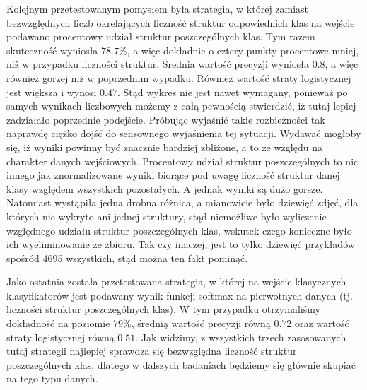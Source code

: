 Kolejnym przetestowanym pomysłem była strategia, w której zamiast bezwzględnych liczb okrelających liczność struktur odpowiednich klas na wejście podawano procentowy udział struktur poszczególnych klas. Tym razem skuteczność wyniosła $78.7\%$, a więc dokładnie o cztery punkty procentowe mniej, niż w przypadku liczności struktur. Średnia wartość precyzji wyniosła $0.8$, a więc również gorzej niż w poprzednim wypadku. Również wartość straty logistycznej jest większa i wynosi $0.47$. Stąd wykres nie jest nawet wymagany, ponieważ po samych wynikach liczbowych możemy z całą pewnością stwierdzić, iż tutaj lepiej zadziałało poprzednie podejście. Próbując wyjaśnić takie rozbieżności tak naprawdę ciężko dojść do sensownego wyjaśnienia tej sytuacji. Wydawać mogłoby się, iż wyniki powinny być znacznie bardziej zbliżone, a to ze względu na charakter danych wejściowych. Procentowy udział struktur poszczególnych to nic innego jak znormalizowane wyniki biorące pod uwagę liczność struktur danej klasy względem wszystkich pozostałych. A jednak wyniki są dużo gorsze. Natomiast wystąpiła jedna drobna różnica, a mianowicie było dziewięć zdjęć, dla których nie wykryto ani jednej struktury, stąd niemożliwe było wyliczenie względnego udziału struktur poszczególnych klas, wskutek czego konieczne było ich wyeliminowanie ze zbioru. Tak czy inaczej, jest to tylko dziewięć przykładów spośród 4695 wszystkich, stąd można ten fakt pominąć. 

Jako ostatnia została przetestowana strategia, w której na wejście klasycznych klasyfikatorów jest podawany wynik funkcji softmax na pierwotnych danych (tj. liczności struktur poszczególnych klas). W tym przypadku otrzymaliśmy dokładność na poziomie $79\%$, średnią wartość precyzji równą $0.72$ oraz wartość straty logistycznej równą $0.51$. Jak widzimy, z wszystkich trzech zasosowanych tutaj strategii najlepiej sprawdza się bezwzględna liczność struktur poszczególnych klas, dlatego w dalszych badaniach będziemy się głównie skupiać na tego typu danych. 

